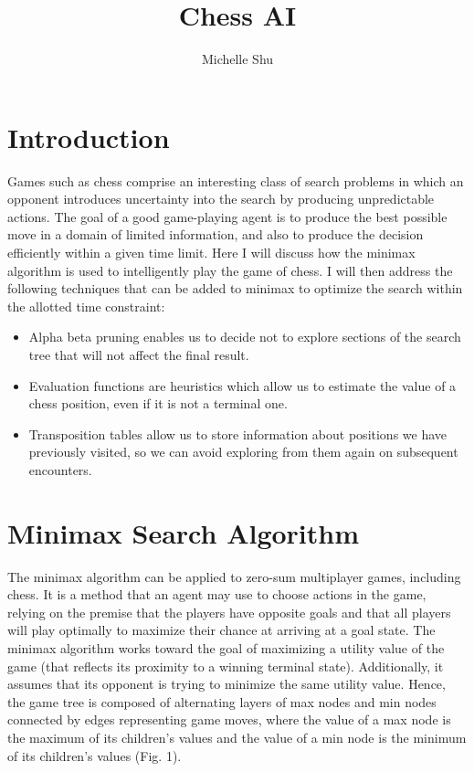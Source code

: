 \documentclass{article}
\title{Chess AI}
\author{Michelle Shu}
\begin{document}
\maketitle

\section{Introduction}

Games such as chess comprise an interesting class of search problems in which an opponent introduces uncertainty into the search by producing unpredictable actions. The goal of a good game-playing agent is to produce the best possible move in a domain of limited information, and also to produce the decision efficiently within a given time limit. Here I will discuss how the minimax algorithm is used to intelligently play the game of chess. I will then address the following techniques that can be added to minimax to optimize the search within the allotted time constraint:

\begin{itemize}
\item Alpha beta pruning enables us to decide not to explore sections of the search tree that will not affect the final result.
\item Evaluation functions are heuristics which allow us to estimate the value of a chess position, even if it is not a terminal one.
\item Transposition tables allow us to store information about positions we have previously visited, so we can avoid exploring from them again on subsequent encounters.
\end{itemize}

\section{Minimax Search Algorithm}

The minimax algorithm can be applied to zero-sum multiplayer games, including chess. It is a method that an agent may use to choose actions in the game, relying on the premise that the players have opposite goals and that all players will play optimally to maximize their chance at arriving at a goal state. The minimax algorithm works toward the goal of maximizing a utility value of the game (that reflects its proximity to a winning terminal state). Additionally, it assumes that its opponent is trying to minimize the same utility value. Hence, the game tree is composed of alternating layers of max nodes and min nodes connected by edges representing game moves, where the value of a max node is the maximum of its children's values and the value of a min node is the minimum of its children's values (Fig. 1).
\end{document}
